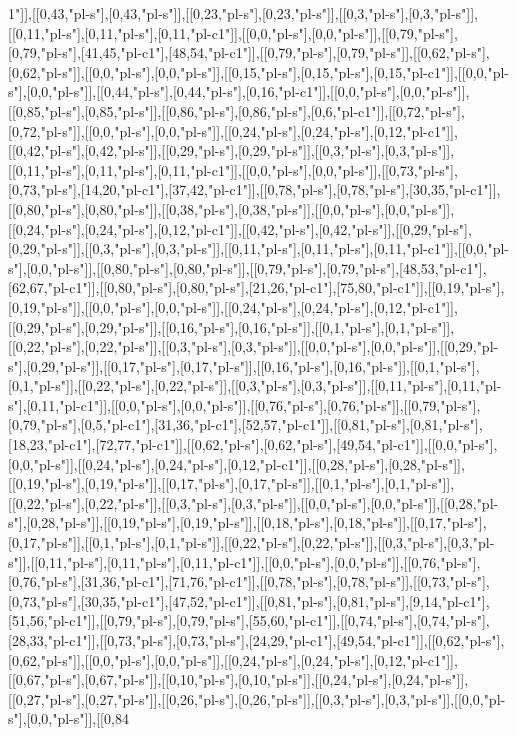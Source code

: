 1"]],[[0,43,"pl-s"],[0,43,"pl-s"]],[[0,23,"pl-s"],[0,23,"pl-s"]],[[0,3,"pl-s"],[0,3,"pl-s"]],[[0,11,"pl-s"],[0,11,"pl-s"],[0,11,"pl-c1"]],[[0,0,"pl-s"],[0,0,"pl-s"]],[[0,79,"pl-s"],[0,79,"pl-s"],[41,45,"pl-c1"],[48,54,"pl-c1"]],[[0,79,"pl-s"],[0,79,"pl-s"]],[[0,62,"pl-s"],[0,62,"pl-s"]],[[0,0,"pl-s"],[0,0,"pl-s"]],[[0,15,"pl-s"],[0,15,"pl-s"],[0,15,"pl-c1"]],[[0,0,"pl-s"],[0,0,"pl-s"]],[[0,44,"pl-s"],[0,44,"pl-s"],[0,16,"pl-c1"]],[[0,0,"pl-s"],[0,0,"pl-s"]],[[0,85,"pl-s"],[0,85,"pl-s"]],[[0,86,"pl-s"],[0,86,"pl-s"],[0,6,"pl-c1"]],[[0,72,"pl-s"],[0,72,"pl-s"]],[[0,0,"pl-s"],[0,0,"pl-s"]],[[0,24,"pl-s"],[0,24,"pl-s"],[0,12,"pl-c1"]],[[0,42,"pl-s"],[0,42,"pl-s"]],[[0,29,"pl-s"],[0,29,"pl-s"]],[[0,3,"pl-s"],[0,3,"pl-s"]],[[0,11,"pl-s"],[0,11,"pl-s"],[0,11,"pl-c1"]],[[0,0,"pl-s"],[0,0,"pl-s"]],[[0,73,"pl-s"],[0,73,"pl-s"],[14,20,"pl-c1"],[37,42,"pl-c1"]],[[0,78,"pl-s"],[0,78,"pl-s"],[30,35,"pl-c1"]],[[0,80,"pl-s"],[0,80,"pl-s"]],[[0,38,"pl-s"],[0,38,"pl-s"]],[[0,0,"pl-s"],[0,0,"pl-s"]],[[0,24,"pl-s"],[0,24,"pl-s"],[0,12,"pl-c1"]],[[0,42,"pl-s"],[0,42,"pl-s"]],[[0,29,"pl-s"],[0,29,"pl-s"]],[[0,3,"pl-s"],[0,3,"pl-s"]],[[0,11,"pl-s"],[0,11,"pl-s"],[0,11,"pl-c1"]],[[0,0,"pl-s"],[0,0,"pl-s"]],[[0,80,"pl-s"],[0,80,"pl-s"]],[[0,79,"pl-s"],[0,79,"pl-s"],[48,53,"pl-c1"],[62,67,"pl-c1"]],[[0,80,"pl-s"],[0,80,"pl-s"],[21,26,"pl-c1"],[75,80,"pl-c1"]],[[0,19,"pl-s"],[0,19,"pl-s"]],[[0,0,"pl-s"],[0,0,"pl-s"]],[[0,24,"pl-s"],[0,24,"pl-s"],[0,12,"pl-c1"]],[[0,29,"pl-s"],[0,29,"pl-s"]],[[0,16,"pl-s"],[0,16,"pl-s"]],[[0,1,"pl-s"],[0,1,"pl-s"]],[[0,22,"pl-s"],[0,22,"pl-s"]],[[0,3,"pl-s"],[0,3,"pl-s"]],[[0,0,"pl-s"],[0,0,"pl-s"]],[[0,29,"pl-s"],[0,29,"pl-s"]],[[0,17,"pl-s"],[0,17,"pl-s"]],[[0,16,"pl-s"],[0,16,"pl-s"]],[[0,1,"pl-s"],[0,1,"pl-s"]],[[0,22,"pl-s"],[0,22,"pl-s"]],[[0,3,"pl-s"],[0,3,"pl-s"]],[[0,11,"pl-s"],[0,11,"pl-s"],[0,11,"pl-c1"]],[[0,0,"pl-s"],[0,0,"pl-s"]],[[0,76,"pl-s"],[0,76,"pl-s"]],[[0,79,"pl-s"],[0,79,"pl-s"],[0,5,"pl-c1"],[31,36,"pl-c1"],[52,57,"pl-c1"]],[[0,81,"pl-s"],[0,81,"pl-s"],[18,23,"pl-c1"],[72,77,"pl-c1"]],[[0,62,"pl-s"],[0,62,"pl-s"],[49,54,"pl-c1"]],[[0,0,"pl-s"],[0,0,"pl-s"]],[[0,24,"pl-s"],[0,24,"pl-s"],[0,12,"pl-c1"]],[[0,28,"pl-s"],[0,28,"pl-s"]],[[0,19,"pl-s"],[0,19,"pl-s"]],[[0,17,"pl-s"],[0,17,"pl-s"]],[[0,1,"pl-s"],[0,1,"pl-s"]],[[0,22,"pl-s"],[0,22,"pl-s"]],[[0,3,"pl-s"],[0,3,"pl-s"]],[[0,0,"pl-s"],[0,0,"pl-s"]],[[0,28,"pl-s"],[0,28,"pl-s"]],[[0,19,"pl-s"],[0,19,"pl-s"]],[[0,18,"pl-s"],[0,18,"pl-s"]],[[0,17,"pl-s"],[0,17,"pl-s"]],[[0,1,"pl-s"],[0,1,"pl-s"]],[[0,22,"pl-s"],[0,22,"pl-s"]],[[0,3,"pl-s"],[0,3,"pl-s"]],[[0,11,"pl-s"],[0,11,"pl-s"],[0,11,"pl-c1"]],[[0,0,"pl-s"],[0,0,"pl-s"]],[[0,76,"pl-s"],[0,76,"pl-s"],[31,36,"pl-c1"],[71,76,"pl-c1"]],[[0,78,"pl-s"],[0,78,"pl-s"]],[[0,73,"pl-s"],[0,73,"pl-s"],[30,35,"pl-c1"],[47,52,"pl-c1"]],[[0,81,"pl-s"],[0,81,"pl-s"],[9,14,"pl-c1"],[51,56,"pl-c1"]],[[0,79,"pl-s"],[0,79,"pl-s"],[55,60,"pl-c1"]],[[0,74,"pl-s"],[0,74,"pl-s"],[28,33,"pl-c1"]],[[0,73,"pl-s"],[0,73,"pl-s"],[24,29,"pl-c1"],[49,54,"pl-c1"]],[[0,62,"pl-s"],[0,62,"pl-s"]],[[0,0,"pl-s"],[0,0,"pl-s"]],[[0,24,"pl-s"],[0,24,"pl-s"],[0,12,"pl-c1"]],[[0,67,"pl-s"],[0,67,"pl-s"]],[[0,10,"pl-s"],[0,10,"pl-s"]],[[0,24,"pl-s"],[0,24,"pl-s"]],[[0,27,"pl-s"],[0,27,"pl-s"]],[[0,26,"pl-s"],[0,26,"pl-s"]],[[0,3,"pl-s"],[0,3,"pl-s"]],[[0,0,"pl-s"],[0,0,"pl-s"]],[[0,84